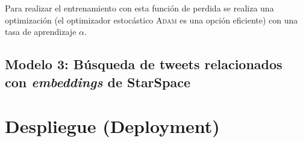 Para realizar el entrenamiento con esta función de perdida se realiza una optimización (el optimizador estocástico \textsc{Adam} \cite{Kingma2014} es una opción eficiente) con una tasa de aprendizaje $\alpha$.


\subsection{Modelo 3: Búsqueda de tweets relacionados con \emph{embeddings} de \mbox{StarSpace}}


\section{Despliegue (Deployment)}
